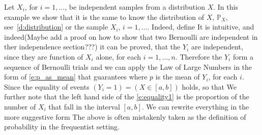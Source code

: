 	\begin{example}
		Let $X_i$,  for $i = 1, \ldots $,  be independent samples from a distribution $X$. In this example we show that it is the same to know the distribution of $X$, $\mathbb P_X$, see~\ref{d:distribution} or the sample $X_i$, $i = 1, \ldots$. Indeed, define    
		It is intuitive, and indeed(Maybe add a proof on how to show that two Bernoulli are independent in ther independence section???) it can be proved, that the $Y_i$ are independent, since they are function of $X_i$ alone, for each $i  = 1, \ldots, n$. Therefore the $Y_i$ form a sequence of Bernoulli trials and we can apply the Law of Large Numbers in the form of \eqref{e:p_as_mean} that guarantees 
	where $p$ is the mean of $Y_i$, for each $i$. Since the equality of events $(Y_i = 1 ) = (X \in [a,b])$ holds, 
	so that 
	We further note that the left hand side of the \eqref{e:equality1} is the proportion of the number of $X_i$ that fall in the interval $[a, b]$. We can rewrite everything in the more suggestive form	
	The above is often mistakenly taken as the definition of probability in the frequentist setting.   
	\end{example}
	
